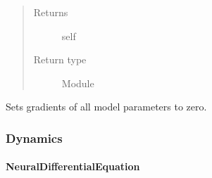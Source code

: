 \documentclass[letterpaper,10pt,english]{sphinxmanual}
\begin{document}
\begin{fulllineitems}
\begin{fulllineitems}
\begin{quote}
\begin{description}
\item[{Returns}] \leavevmode
self

\item[{Return type}] \leavevmode
Module

\end{description}\end{quote}

\end{fulllineitems}


\begin{fulllineitems}
\label{\detokenize{api/autoencoding:geology.metamodelling.SpatialAutoencoder.zero_grad}}
Sets gradients of all model parameters to zero.

\end{fulllineitems}


\end{fulllineitems}



\subsubsection{Dynamics}
\label{\detokenize{api/dynamics:dynamics}}\label{\detokenize{api/dynamics::doc}}

\paragraph{NeuralDifferentialEquation}
\label{\detokenize{api/dynamics:neuraldifferentialequation}}
\end{document}
